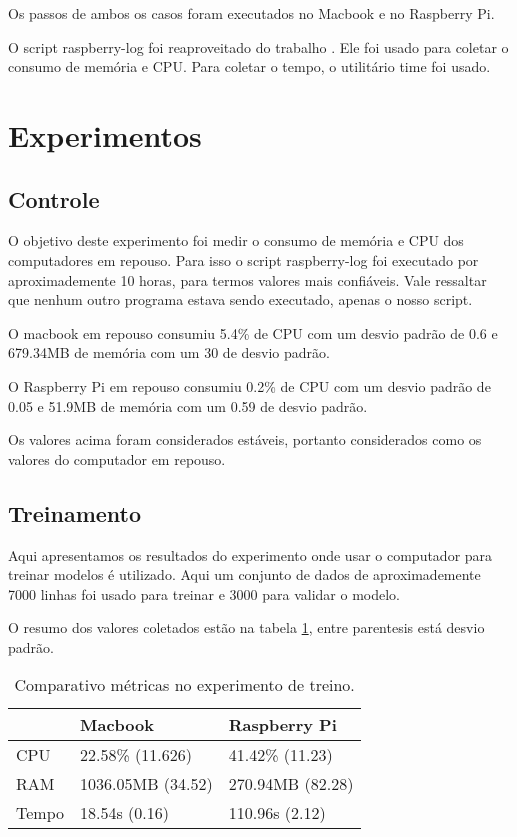 Os passos de ambos os casos foram executados no Macbook e no Raspberry Pi.

O script raspberry-log foi reaproveitado do trabalho \cite{tcc:lucas}. Ele foi usado para 
coletar o consumo de memória e CPU. Para coletar o tempo, o utilitário time 
foi usado.


\section{Experimentos}

\subsection{Controle}

O objetivo deste experimento foi medir o consumo de memória e CPU dos computadores
em repouso. Para isso o script raspberry-log foi executado por aproximademente 10 horas, 
para termos valores mais confiáveis. Vale ressaltar que nenhum outro programa estava sendo 
executado, apenas o nosso script.

O macbook em repouso consumiu 5.4\% de CPU com um desvio padrão de 0.6 
e 679.34MB de memória com um 30 de desvio padrão.

O Raspberry Pi em repouso consumiu 0.2\% de CPU com um desvio padrão de 0.05 
e 51.9MB de memória com um 0.59 de desvio padrão.

Os valores acima foram considerados estáveis, portanto considerados como os valores
do computador em repouso.



\subsection{Treinamento}

Aqui apresentamos os resultados do experimento onde usar o computador para treinar 
modelos é utilizado. Aqui um conjunto de dados de aproximademente 7000 linhas foi 
usado para treinar e 3000 para validar o modelo.

O resumo dos valores coletados estão na tabela \ref{tab:comparativo_treino}, entre parentesis está desvio
padrão.

\begin{table}[!ht]
    \centering
    \begin{tabular}{|l|l|l|}
    \hline
        ~ & Macbook & Raspberry Pi \\ \hline
        CPU & 22.58\% (11.626) & 41.42\% (11.23) \\ \hline
        RAM & 1036.05MB (34.52) & 270.94MB (82.28) \\ \hline
        Tempo & 18.54s (0.16) & 110.96s (2.12) \\ \hline
    \end{tabular}

    \caption{Comparativo métricas no experimento de treino.\label{tab:comparativo_treino}}
\end{table}

